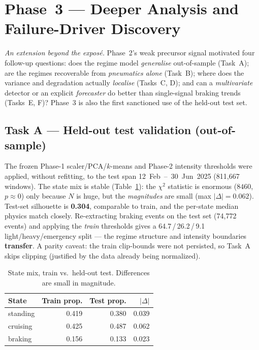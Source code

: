 \documentclass[11pt,a4paper]{article}
\begin{document}
\setcounter{section}{6}
\section{Phase~3 --- Deeper Analysis and Failure-Driver Discovery}
\label{sec:phase3}

\textit{An extension beyond the exposé.} Phase~2's weak precursor signal motivated four
follow-up questions: does the regime model \emph{generalise} out-of-sample (Task~A); are
the regimes recoverable from \emph{pneumatics alone} (Task~B); where does the variance and
degradation actually \emph{localise} (Tasks~C, D); and can a \emph{multivariate} detector
or an explicit \emph{forecaster} do better than single-signal braking trends (Tasks~E, F)?
Phase~3 is also the first sanctioned use of the held-out test set.

\subsection{Task A --- Held-out test validation (out-of-sample)}
The frozen Phase-1 scaler/PCA/$k$-means and Phase-2 intensity thresholds were applied,
without refitting, to the test span 12~Feb~--~30~Jun~2025 (811{,}667 windows). The state
mix is stable (Table~\ref{tab:traintest}): the $\chi^2$ statistic is enormous
($8460$, $p\approx0$) only because $N$ is huge, but the \emph{magnitudes} are small
(max $|\Delta|=0.062$). Test-set silhouette is \textbf{0.304}, comparable to train, and
the per-state median physics match closely. Re-extracting braking events on the test set
(74{,}772 events) and applying the \emph{train} thresholds gives a 64.7\,/\,26.2\,/\,9.1
light/heavy/emergency split --- the regime structure and intensity boundaries
\textbf{transfer}. A parity caveat: the train clip-bounds were not persisted, so Task~A
skips clipping (justified by the data already being normalized).

\begin{table}[H]
\centering
\caption{State mix, train vs.\ held-out test. Differences are small in magnitude.}
\label{tab:traintest}
\small
\begin{tabular}{l r r r}
\toprule
State & Train prop. & Test prop. & $|\Delta|$\\
\midrule
standing & 0.419 & 0.380 & 0.039\\
cruising & 0.425 & 0.487 & 0.062\\
braking & 0.156 & 0.133 & 0.023\\
\bottomrule
\end{tabular}
\end{table}
\end{document}
